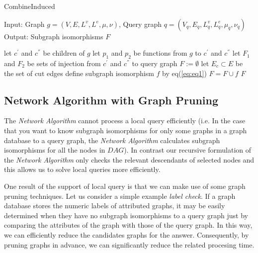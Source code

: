 \begin{algorithm}[t]
\caption{CombineInduced}
\label{alg:alg8}
\begin{algorithmic}
\STATE Input: Graph $g=(V,E,L^v ,L^e ,\mu,\nu)$, Query graph $q=(V_q,E_q,L_q^v ,L_q^e ,\mu_q,\nu_q)$ 
\STATE Output: Subgraph isomorphisms $F$
\end{algorithmic}
\begin{algorithmic}[1]
\STATE let $c^{'}$ and $c^{''}$ be children of $g$
\STATE let $p_1$ and $p_2$ be functions from $g$ to $c^{'}$ and $c^{''}$
\STATE let $F_1$ and $F_2$ be sets of injection from $c^{'}$ and $c^{''}$ to query graph
\STATE $F := \emptyset$
\STATE let $E_c \subset E$ be the set of cut edges
				\STATE define subgraph isomorphism $f$ by eq(\ref{eq:eq1})
				\STATE $F = F \cup f $
		\ENDIF
	\ENDIF
\ENDFOR
\RETURN $F$
\end{algorithmic}
\end{algorithm}

\subsection{Network Algorithm with Graph Pruning}
The \textit{Network Algorithm} cannot process a local query efficiently (i.e. In the case that you want to know subgraph isomorphisms for only some graphs in a 
graph database to a query graph, the \textit{Network Algorithm} calculates subgraph isomorphisms for all the nodes in $DAG$).
In contrast our recursive formulation of the \textit{Network Algorithm} only checks the relevant descendants of selected nodes and this allows us to solve 
local queries more efficiently.

One result of the support of local query is that we can make use of some graph pruning techniques. Let us consider a simple example \textit{label check}. 
If a graph database stores the numeric labels of attributed graphs, it may be easily determined when they have no subgraph isomorphisms to 
a query graph just by comparing the attributes of the graph with those of the query graph.
In this way, we can efficiently reduce the candidates graphs for the answer.
Consequently, by pruning graphs in advance, we can significantly reduce the related procesing time.


